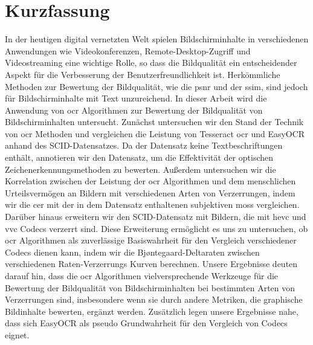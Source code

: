 \chapter{Kurzfassung}

In der heutigen digital vernetzten Welt spielen Bildschirminhalte in verschiedenen Anwendungen wie Videokonferenzen, Remote-Desktop-Zugriff und Videostreaming eine wichtige Rolle, so dass die Bildqualität ein entscheidender Aspekt für die Verbesserung der Benutzerfreundlichkeit ist.
Herkömmliche Methoden zur Bewertung der Bildqualität, wie die \gls{psnr} und der \gls{ssim}, sind jedoch für Bildschirminhalte mit Text unzureichend.
In dieser Arbeit wird die Anwendung von \gls{ocr} Algorithmen zur Bewertung der Bildqualität von Bildschirminhalten untersucht.
Zunächst untersuchen wir den Stand der Technik von \gls{ocr} Methoden und vergleichen die Leistung von Tesseract \gls{ocr} und EasyOCR anhand des SCID-Datensatzes. 
Da der Datensatz keine Textbeschriftungen enthält, annotieren wir den Datensatz, um die Effektivität der optischen Zeichenerkennungsmethoden zu bewerten.
Außerdem untersuchen wir die Korrelation zwischen der Leistung der \gls{ocr} Algorithmen und dem menschlichen Urteilsvermögen an Bildern mit verschiedenen Arten von Verzerrungen, indem wir die \gls{cer} mit der in dem Datensatz enthaltenen subjektiven \glspl{mos} vergleichen.
Darüber hinaus erweitern wir den SCID-Datensatz mit Bildern, die mit \gls{hevc} und \gls{vvc} Codecs verzerrt sind.
Diese Erweiterung ermöglicht es uns zu untersuchen, ob \gls{ocr} Algorithmen als zuverlässige Basiswahrheit für den Vergleich verschiedener Codecs dienen kann, indem wir die Bjøntegaard-Deltaraten zwischen verschiedenen Raten-Verzerrungs Kurven berechnen.
Unsere Ergebnisse deuten darauf hin, dass die \gls{ocr} Algorithmen vielversprechende Werkzeuge für die Bewertung der Bildqualität von Bildschirminhalten bei bestimmten Arten von Verzerrungen sind, insbesondere wenn sie durch andere Metriken, die graphische Bildinhalte bewerten, ergänzt werden.
Zusätzlich legen unsere Ergebnisse nahe, dass sich EasyOCR als pseudo Grundwahrheit für den Vergleich von Codecs eignet.

